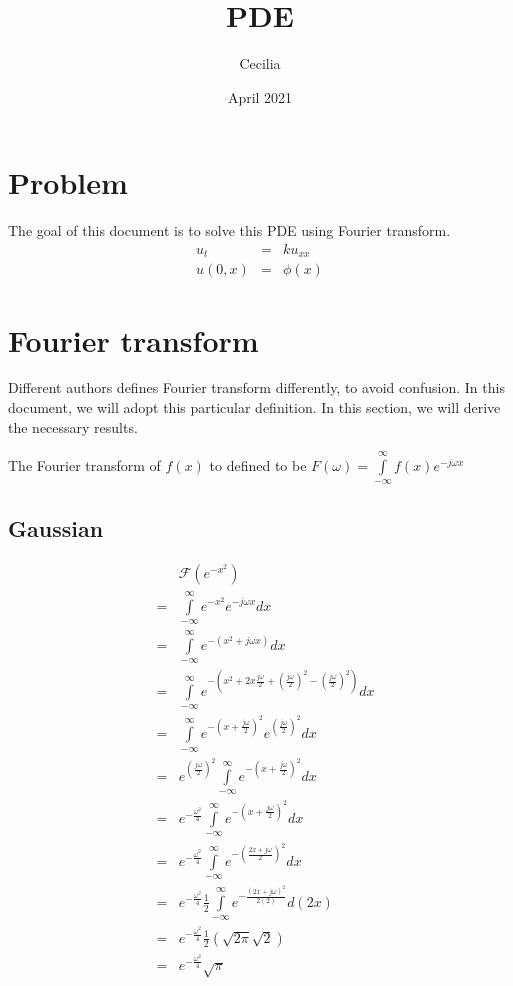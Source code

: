 \documentclass{article}
\title{PDE}
\author{Cecilia}
\date{April 2021}
\begin{document}
\maketitle

\section*{Problem}
The goal of this document is to solve this PDE using Fourier transform.
\begin{eqnarray*}
      u_t &=& ku_{xx} \\
  u(0, x) &=& \phi(x)
\end{eqnarray*}

\section*{Fourier transform}
Different authors defines Fourier transform differently, to avoid confusion. In this document, we will adopt this particular definition. In this section, we will derive the necessary results.

The Fourier transform of $ f(x) $ to defined to be $ F(\omega) = \int\limits_{-\infty}^{\infty}f(x)e^{-j\omega x} $

\subsection*{Gaussian}

\begin{eqnarray*}
  & & \mathcal{F}(e^{-x^2}) \\
  &=& \int\limits_{-\infty}^{\infty}e^{-x^2}e^{-j\omega x}dx \\
  &=& \int\limits_{-\infty}^{\infty}e^{-(x^2+j\omega x)}dx \\
  &=& \int\limits_{-\infty}^{\infty}e^{-\left(x^2+2x\frac{j\omega }{2}+\left(\frac{j\omega}{2}\right)^2-\left(\frac{j\omega}{2}\right)^2\right)}dx \\
  &=& \int\limits_{-\infty}^{\infty}e^{-\left(x + \frac{j\omega}{2}\right)^2}e^{\left(\frac{j\omega}{2}\right)^2}dx \\  
  &=& e^{\left(\frac{j\omega}{2}\right)^2}\int\limits_{-\infty}^{\infty}e^{-\left(x + \frac{j\omega}{2}\right)^2}dx \\
  &=& e^{-\frac{\omega^2}{4}}\int\limits_{-\infty}^{\infty}e^{-\left(x + \frac{j\omega}{2}\right)^2}dx \\  
  &=& e^{-\frac{\omega^2}{4}}\int\limits_{-\infty}^{\infty}e^{-\left( \frac{2x + j\omega}{2}\right)^2}dx \\ 
  &=& e^{-\frac{\omega^2}{4}}\frac{1}{2}\int\limits_{-\infty}^{\infty}e^{-\frac{(2x + j\omega)^2}{2(2)}}d(2x) \\
  &=& e^{-\frac{\omega^2}{4}}\frac{1}{2}(\sqrt{2\pi}\sqrt{2}) \\
  &=& e^{-\frac{\omega^2}{4}}\sqrt{\pi}
\end{eqnarray*}
\end{document}

